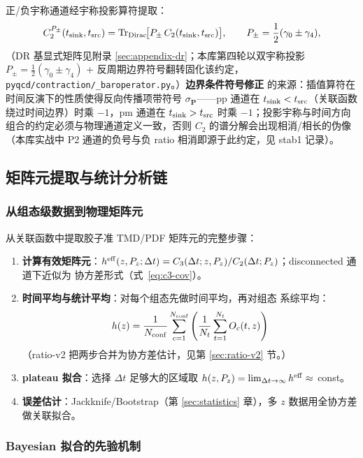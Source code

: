 \documentclass[11pt,a4paper]{ctexart}
\newcommand{\code}[1]{\texttt{#1}}
\begin{document}
正/负宇称通道经宇称投影算符提取：
\begin{equation}
C_2^{P_\pm}(t_{\rm sink},t_{\rm src})
= \operatorname{Tr}_{\rm Dirac}\!\bigl[P_\pm\,C_2(t_{\rm sink},
t_{\rm src})\bigr],
\qquad P_\pm = \frac12(\gamma_0 \pm \gamma_4),
\end{equation}
（DR 基显式矩阵见附录 \ref{sec:appendix-dr}；本库第四轮以双宇称投影
$P_\pm=\frac12(\gamma_0\pm\gamma_4)$ + 反周期边界符号翻转固化该约定，
\code{pyqcd/contraction/\_baroperator.py}。）\textbf{边界条件符号修正}
的来源：插值算符在时间反演下的性质使得反向传播项带符号
$\sigma_{\mathbf P}$——pp 通道在 $t_{\rm sink}<t_{\rm src}$（关联函数
绕过时间边界）时乘 $-1$，pm 通道在 $t_{\rm sink}>t_{\rm src}$ 时乘
$-1$；投影宇称与时间方向组合的约定必须与物理通道定义一致，否则
$C_2$ 的谱分解会出现相消/相长的伪像（本库实战中 P2 通道的负号与负
ratio 相消即源于此约定，见 stab1 记录）。

\subsection{矩阵元提取与统计分析链}

\subsubsection{从组态级数据到物理矩阵元}

从关联函数中提取胶子准 TMD/PDF 矩阵元的完整步骤：
\begin{enumerate}
  \item \textbf{计算有效矩阵元}：$h^{\rm eff}(z,P_z;\Delta t)
  = C_3(\Delta t;z,P_z)/C_2(\Delta t;P_z)$；disconnected 通道下近似为
  协方差形式（式~\eqref{eq:c3-cov}）。
  \item \textbf{时间平均与统计平均}：对每个组态先做时间平均，再对组态
  系综平均：
  \begin{equation}
  h(z) = \frac{1}{N_{\rm conf}}\sum_{c=1}^{N_{\rm conf}}
  \left(\frac{1}{N_t}\sum_{t=1}^{N_t} O_c(t,z)\right)
  \end{equation}
  （ratio-v2 把两步合并为协方差估计，见第 \ref{sec:ratio-v2} 节。）
  \item \textbf{plateau 拟合}：选择 $\Delta t$ 足够大的区域取
  $h(z,P_z)=\lim_{\Delta t\to\infty}h^{\rm eff}\approx$ const。
  \item \textbf{误差估计}：Jackknife/Bootstrap（第 \ref{sec:statistics}
  章），多 $z$ 数据用全协方差做关联拟合。
\end{enumerate}

\subsubsection{Bayesian 拟合的先验机制}
\end{document}
